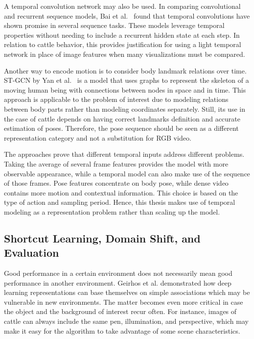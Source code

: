 A temporal convolution network may also be used. In comparing convolutional and recurrent sequence models, Bai et al.~\cite{bai2018tcn} found that temporal convolutions have shown promise in several sequence tasks. These models leverage temporal properties without needing to include a recurrent hidden state at each step. In relation to cattle behavior, this provides justification for using a light temporal network in place of image features when many visualizations must be compared.

Another way to encode motion is to consider body landmark relations over time. ST-GCN by Yan et al.~\cite{yan2018stgcn} is a model that uses graphs to represent the skeleton of a moving human being with connections between nodes in space and in time. This approach is applicable to the problem of interest due to modeling relations between body parts rather than modeling coordinates separately. Still, its use in the case of cattle depends on having correct landmarks definition and accurate estimation of poses. Therefore, the pose sequence should be seen as a different representation category and not a substitution for RGB video.

The approaches prove that different temporal inputs address different problems. Taking the average of several frame features provides the model with more observable appearance, while a temporal model can also make use of the sequence of those frames. Pose features concentrate on body pose, while dense video contains more motion and contextual information. This choice is based on the type of action and sampling period. Hence, this thesis makes use of temporal modeling as a representation problem rather than scaling up the model.

\subsection{Shortcut Learning, Domain Shift, and Evaluation}

Good performance in a certain environment does not necessarily mean good performance in another environment. Geirhos et al. demonstrated how deep learning representations can base themselves on simple associations which may be vulnerable in new environments. The matter becomes even more critical in case the object and the background of interest recur often. For instance, images of cattle can always include the same pen, illumination, and perspective, which may make it easy for the algorithm to take advantage of some scene characteristics.

